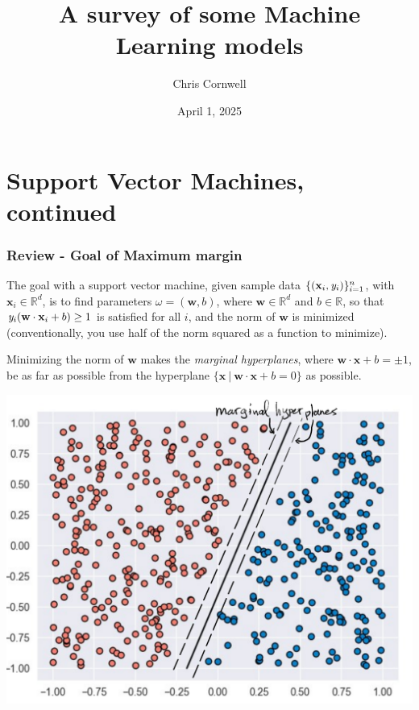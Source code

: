 \documentclass[smaller]{beamer}
\author{Chris Cornwell}
\date{April 1, 2025}
\title{A survey of some Machine Learning models}
\theoremstyle{example}
\newcommand{\x}{\textbf{x}}
\newcommand{\ix}[1]{{\it #1}}
\begin{document}
\begin{frame}
\titlepage
\end{frame}

\section{Support Vector Machines, continued}

\begin{frame}
\frametitle{Review - Goal of Maximum margin}
    The goal with a support vector machine, given sample data $\{(\x_i, \ix y_i)\}_{i=1}^n$, with $\x_i\in\mathbb R^d$, is to find parameters $\omega=(\textbf{w},b)$, where $\textbf{w}\in\mathbb R^d$ and $b\in\mathbb R$, so that $\ix y_i(\textbf{w}\cdot{\x}_i + b) \ge 1$ is satisfied for all $i$, and the norm of $\textbf{w}$ is minimized (conventionally, you use half of the norm squared as a function to minimize).
    
    \pause
    Minimizing the norm of $\textbf{w}$ makes the \textit{marginal hyperplanes}, where $\textbf{w}\cdot{\x} + b = \pm 1$, be as far as possible from the hyperplane $\{\x\ |\ \textbf{w}\cdot\x + b = 0\}$ as possible.

    \centering
    \includegraphics[height=0.35\textheight]{../../Images/Hfit-simulated-marginal-hyperplanes.png}
\vspace*{12pt}

\end{frame}
\end{document}
